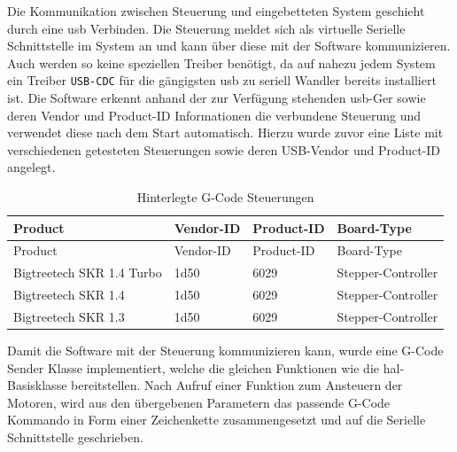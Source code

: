 Die Kommunikation zwischen Steuerung und eingebetteten System geschieht
durch eine \gls{usb} Verbinden. Die Steuerung meldet sich als virtuelle
Serielle Schnittstelle im System an und kann über diese mit der Software
kommunizieren. Auch werden so keine speziellen Treiber benötigt, da auf
nahezu jedem System ein Treiber \passthrough{\lstinline!USB-CDC!} für
die gängigsten \gls{usb} zu seriell Wandler bereits installiert ist. Die
Software erkennt anhand der zur Verfügung stehenden \gls{usb}-Ger sowie
deren Vendor und Product-ID Informationen die verbundene Steuerung und
verwendet diese nach dem Start automatisch. Hierzu wurde zuvor eine
Liste mit verschiedenen getesteten Steuerungen sowie deren USB-Vendor
und Product-ID angelegt.

\begin{longtable}[]{@{}llll@{}}
\caption{Hinterlegte G-Code Steuerungen}\tabularnewline
\toprule
Product & Vendor-ID & Product-ID & Board-Type\tabularnewline
\midrule
\endfirsthead
\toprule
Product & Vendor-ID & Product-ID & Board-Type\tabularnewline
\midrule
\endhead
Bigtreetech SKR 1.4 Turbo & 1d50 & 6029 &
Stepper-Controller\tabularnewline
Bigtreetech SKR 1.4 & 1d50 & 6029 & Stepper-Controller\tabularnewline
Bigtreetech SKR 1.3 & 1d50 & 6029 & Stepper-Controller\tabularnewline
\bottomrule
\end{longtable}

Damit die Software mit der Steuerung kommunizieren kann, wurde eine
G-Code Sender Klasse implementiert, welche die gleichen Funktionen wie
die \gls{hal}-Basisklasse bereitstellen. Nach Aufruf einer Funktion zum
Ansteuern der Motoren, wird aus den übergebenen Parametern das passende
G-Code Kommando in Form einer Zeichenkette zusammengesetzt und auf die
Serielle Schnittstelle geschrieben.

